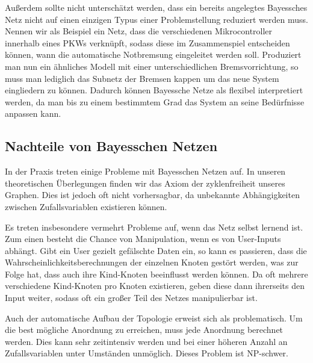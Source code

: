 Außerdem sollte nicht unterschätzt werden, dass ein bereits angelegtes Bayessches Netz nicht auf einen einzigen Typus einer
Problemstellung reduziert werden muss. Nennen wir als Beispiel ein Netz, dass die verschiedenen Mikrocontroller innerhalb eines
PKWs verknüpft, sodass diese im Zusammenspiel entscheiden können, wann die automatische Notbremsung eingeleitet werden soll.
Produziert man nun ein ähnliches Modell mit einer unterschiedlichen Bremsvorrichtung, so muss man lediglich das Subnetz der
Bremsen kappen um das neue System eingliedern zu können.   
Dadurch können Bayessche Netze als flexibel interpretiert werden, da man bis zu einem bestimmtem Grad das System an seine 
Bedürfnisse anpassen kann.

\subsection{Nachteile von Bayesschen Netzen}			
In der Praxis treten einige Probleme mit Bayesschen Netzen auf. In unseren theoretischen Überlegungen finden wir das Axiom
der zyklenfreiheit unseres Graphen. Dies ist jedoch oft nicht vorhersagbar, da unbekannte Abhängigkeiten zwischen Zufallsvariablen
existieren können. 

Es treten insbesondere vermehrt Probleme auf, wenn das Netz selbst lernend ist.
Zum einen besteht die Chance von Manipulation, wenn es von User-Inputs abhängt. Gibt ein User gezielt gefälschte Daten ein, 
so kann es passieren, dass die Wahrscheinlichkeitsberechnungen der einzelnen Knoten gestört werden, was zur Folge hat, dass 
auch ihre Kind-Knoten beeinflusst werden können. Da oft mehrere verschiedene Kind-Knoten pro Knoten existieren,  geben diese
dann ihrerseits den Input weiter, sodass oft ein großer Teil des Netzes manipulierbar ist.

Auch der automatische Aufbau der Topologie erweist sich als problematisch. Um die best mögliche Anordnung zu erreichen, muss 
jede Anordnung berechnet werden. Dies kann sehr zeitintensiv werden und bei einer höheren Anzahl an Zufallsvariablen unter 
Umständen unmöglich. Dieses Problem ist NP-schwer.


